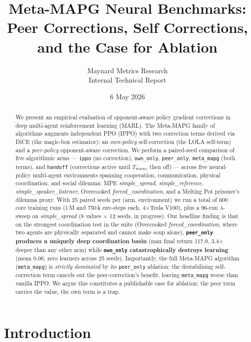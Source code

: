 \documentclass[11pt,a4paper]{article}
\title{
    \vspace{-1.0cm}
    \textbf{Meta-MAPG Neural Benchmarks: \\ Peer Corrections, Self Corrections, and the Case for Ablation}
}
\author{
    Maynard Metrics Research \\
    \small Internal Technical Report
}
\date{6 May 2026}
\newcommand{\arm}[1]{\texttt{#1}}
\newcommand{\Twarm}{T_{\text{warm}}}
\begin{document}
\maketitle

\begin{abstract}
We present an empirical evaluation of opponent-aware policy gradient corrections in deep multi-agent reinforcement learning (MARL).
The Meta-MAPG family of algorithms augments independent PPO (IPPO) with two correction terms derived via DiCE (the magic-box estimator):
an \emph{own-policy} self-correction (the LOLA self-term) and a \emph{peer-policy} opponent-aware correction.
We perform a paired-seed comparison of five algorithmic arms ---
\arm{ippo} (no correction), \arm{own\_only}, \arm{peer\_only}, \arm{meta\_mapg} (both terms), and \arm{handoff} (corrections active until $\Twarm$, then off) ---
across five neural-policy multi-agent environments spanning cooperation, communication, physical coordination, and social dilemma:
MPE \emph{simple\_spread}, \emph{simple\_reference}, \emph{simple\_speaker\_listener},
Overcooked \emph{forced\_coordination}, and a Melting Pot prisoner's dilemma proxy.
With 25 paired seeds per (arm, environment) we run a total of 600 core training runs (1\,M and 750\,k env-steps each, 4$\times$Tesla V100), plus a 96-run $\lambda$-sweep on \emph{simple\_spread} (8 values $\times$ 12 seeds, in progress).
Our headline finding is that on the strongest coordination test in the suite (Overcooked \emph{forced\_coordination}, where two agents are physically separated and cannot make soup alone),
\textbf{\arm{peer\_only} produces a uniquely deep coordination basin} (max final return 117.0, 3.4$\times$ deeper than any other arm)
while \textbf{\arm{own\_only} catastrophically destroys learning} (mean 0.06; zero learners across 25 seeds).
Importantly, the full Meta-MAPG algorithm (\arm{meta\_mapg}) is \emph{strictly dominated} by its \arm{peer\_only} ablation:
the destabilising self-correction term cancels out the peer-correction's benefit, leaving \arm{meta\_mapg} worse than vanilla IPPO.
We argue this constitutes a publishable case for ablation: the peer term carries the value, the own term is a trap.
\end{abstract}

\tableofcontents

\section{Introduction}\label{sec:intro}
\end{document}
